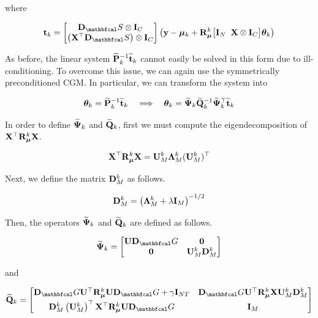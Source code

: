 where 

\begin{equation}
    \tee_k = \begin{bmatrix}
        \D_\St \otimes \I_C \\ \left(\X^\top \D_\St\right) \otimes \I_C
    \end{bmatrix} \left( \y - \muu_k + \RR_{\muu}^k  \big[\I_N \;\; \X \otimes \I_C\big] \thetaa_k \right)
\end{equation}

As before, the linear system $\widetilde{\mathbf{P}}_k^{-1} \widetilde{\mathbf{t}}_k $ cannot easily be solved in this form due to ill-conditioning. To overcome this issue, we can again use the symmetrically preconditioned CGM. In particular, we can transform the system into 

\begin{equation*}
    \boldsymbol{\theta}_k = \widetilde{\mathbf{P}}^{-1}_k \widetilde{\mathbf{t}}_k \quad \Longrightarrow \quad \boldsymbol{\theta}_k = \widetilde{\mathbf{\Psi}}_k \widetilde{\mathbf{Q}}_k^{-1} \widetilde{\mathbf{\Psi}}_k^\top \widetilde{\mathbf{t}}_k
\end{equation*}

In order to define $\widetilde{\mathbf{\Psi}}_k$ and $\widetilde{\mathbf{Q}}_k$, first we must compute the eigendecomposition of $\mathbf{X}^\top \mathbf{R}_{\boldsymbol{\mu}}^k \mathbf{X}$. 

\begin{equation}
    \mathbf{X}^\top \mathbf{R}_{\boldsymbol{\mu}}^k \mathbf{X} = \mathbf{U}_M^k \mathbf{\Lambda}_M^k (\mathbf{U}_M^k)^\top 
\end{equation}

Next, we define the matrix $\mathbf{D}_M^k$ as follows. 

\begin{equation}
    \mathbf{D}_M^k = \left(\mathbf{\Lambda}_M^k + \lambda \mathbf{I}_M\right)^{-1/2}
\end{equation}

Then, the operators $\widetilde{\mathbf{\Psi}}_k$ and $\widetilde{\mathbf{Q}}_k$ are defined as follows. 

\begin{equation}
    \widetilde{\PSI}_k = \begin{bmatrix}
        \U \D_\Gt & \zero \\
        \zero & \U_M^k \D_M^k
    \end{bmatrix}
\end{equation}

and 

\begin{equation}
    \widetilde{\Q}_k = 
       \begin{bmatrix}
        \D_\Gt \U^\top \RR_{\muu}^k \U \D_\Gt + \gamma \I_{NT}  &  \D_\Gt \U^\top \RR_{\muu}^k \X \U_M^k \D_M^k \\[0.1cm] 
        \D_M^k \left(\U_M^k\right)^\top \X^\top \RR_{\muu}^k \U \D_\Gt & \I_M
        \end{bmatrix}
\end{equation}

